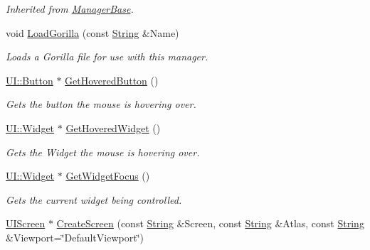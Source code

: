 \begin{DoxyCompactItemize}
\begin{DoxyCompactList}\small\item\em Inherited from \hyperlink{classphys_1_1ManagerBase}{ManagerBase}. \item\end{DoxyCompactList}\item 
void \hyperlink{classphys_1_1UIManager_afda4422105d6ab353fd40410adffbc0a}{LoadGorilla} (const \hyperlink{namespacephys_aa03900411993de7fbfec4789bc1d392e}{String} \&Name)
\begin{DoxyCompactList}\small\item\em Loads a Gorilla file for use with this manager. \item\end{DoxyCompactList}\item 
\hyperlink{classphys_1_1UI_1_1Button}{UI::Button} $\ast$ \hyperlink{classphys_1_1UIManager_acd08dba5be95182a6c923ed698822277}{GetHoveredButton} ()
\begin{DoxyCompactList}\small\item\em Gets the button the mouse is hovering over. \item\end{DoxyCompactList}\item 
\hyperlink{classphys_1_1UI_1_1Widget}{UI::Widget} $\ast$ \hyperlink{classphys_1_1UIManager_a5772b611b6881eb98932f4b400b44d09}{GetHoveredWidget} ()
\begin{DoxyCompactList}\small\item\em Gets the Widget the mouse is hovering over. \item\end{DoxyCompactList}\item 
\hyperlink{classphys_1_1UI_1_1Widget}{UI::Widget} $\ast$ \hyperlink{classphys_1_1UIManager_a99694297814d2e82ec507c6f4d6bec1a}{GetWidgetFocus} ()
\begin{DoxyCompactList}\small\item\em Gets the current widget being controlled. \item\end{DoxyCompactList}\item 
\hyperlink{classphys_1_1UIScreen}{UIScreen} $\ast$ \hyperlink{classphys_1_1UIManager_a7cad638d86489e03fa2599185514b58c}{CreateScreen} (const \hyperlink{namespacephys_aa03900411993de7fbfec4789bc1d392e}{String} \&Screen, const \hyperlink{namespacephys_aa03900411993de7fbfec4789bc1d392e}{String} \&Atlas, const \hyperlink{namespacephys_aa03900411993de7fbfec4789bc1d392e}{String} \&Viewport=\char`\"{}DefaultViewport\char`\"{})

\end{DoxyCompactItemize}
